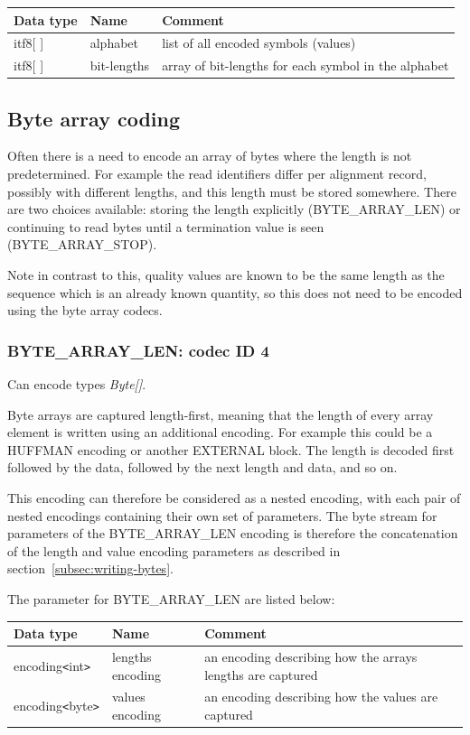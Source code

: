 \documentclass[a4paper]{article}
\begin{document}
\begin{tabular}{|>{\raggedright}p{100pt}|>{\raggedright}p{100pt}|>{\raggedright}p{230pt}|}
\hline
\textbf{Data type} & \textbf{Name} & \textbf{Comment}
\tabularnewline
\hline
itf8[ ] & alphabet & list of all encoded symbols (values)\tabularnewline
\hline
itf8[ ] & bit-lengths & array of bit-lengths for each symbol in the alphabet\tabularnewline
\hline
\end{tabular}

\subsection{Byte array coding}

Often there is a need to encode an array of bytes where the length is not predetermined.
For example the read identifiers differ per alignment record, possibly with different lengths, and this length must be stored somewhere.
There are two choices available: storing the length explicitly (BYTE\_ARRAY\_LEN) or continuing to read bytes until a termination value is seen (BYTE\_ARRAY\_STOP).

Note in contrast to this, quality values are known to be the same length as the sequence which is an already known quantity, so this does not need to be encoded using the byte array codecs.

\subsubsection*{BYTE\_ARRAY\_LEN: codec ID 4}

Can encode types \textit{Byte[]}.

Byte arrays are captured length-first, meaning that the length of every array element is written using an additional encoding.
For example this could be a HUFFMAN encoding or another EXTERNAL block.
The length is decoded first followed by the data, followed by the next length and data, and so on.

This encoding can therefore be considered as a nested encoding, with each pair of nested encodings containing their own set of parameters.
The byte stream for parameters of the BYTE\_ARRAY\_LEN encoding is therefore the concatenation of the length and value encoding parameters as described in section~\ref{subsec:writing-bytes}.

The parameter for BYTE\_ARRAY\_LEN are listed below:

\begin{tabular}{|>{\raggedright}p{100pt}|>{\raggedright}p{100pt}|>{\raggedright}p{230pt}|}
\hline
\textbf{Data type} & \textbf{Name} & \textbf{Comment}
\tabularnewline
\hline
encoding\texttt{<}int\texttt{>} & lengths encoding & an encoding describing how 
the arrays lengths are captured\tabularnewline
\hline
encoding\texttt{<}byte\texttt{>} & values encoding & an encoding describing how 
the values are captured\tabularnewline
\hline
\end{tabular}
\end{document}
